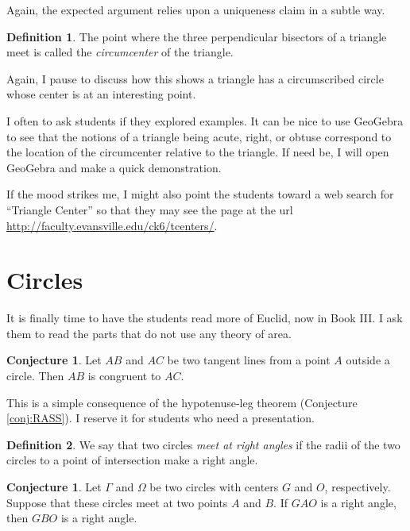 \documentclass{tufte-handout}
\theoremstyle{definition}
\newtheorem{conjecture}[problem]{Conjecture}
\newtheorem*{definition}{Definition}
\begin{document}
Again, the expected argument relies upon a uniqueness claim in a subtle way.

\begin{definition}\label{defn:circumcenter}
The point where the three perpendicular bisectors of a triangle meet is called the \emph{circumcenter} of the triangle.
\end{definition}

Again, I pause to discuss how this shows a triangle has a circumscribed circle whose center is at an interesting point.

I often to ask students if they explored examples. It can be nice to use GeoGebra to see that the notions of a triangle being acute, right, or obtuse correspond to the location of the circumcenter relative to the triangle. If need be, I will open GeoGebra and make a quick demonstration.


If the mood strikes me, I might also point the students toward a web search for ``Triangle Center'' so that they may see the page at the url \url{http://faculty.evansville.edu/ck6/tcenters/}.


\clearpage
\setcounter{section}{9}
\setcounter{problem}{0}
\section{Circles}

It is finally time to have the students read more of Euclid, now in Book III. I ask them to read the parts that do not use any theory of area. 

\begin{conjecture}\label{conj:tangents-to-circle}
Let $AB$ and $AC$ be two tangent lines from a point $A$ outside a circle. Then $AB$ is congruent to $AC$.
\end{conjecture}

This is a simple consequence of the hypotenuse-leg theorem (Conjecture \ref{conj:RASS}). I reserve it for students who need a presentation.

\begin{definition}\label{defn:circles-perp}
We say that two circles \emph{meet at right angles} if the radii of the two circles to a point of intersection make a right angle.
\end{definition}

\begin{conjecture}\label{conj:perp-circles}
Let $\Gamma$ and $\Omega$ be two circles with centers $G$ and $O$, respectively. Suppose that these circles meet at two points $A$ and $B$. If $GAO$ is a right angle, then $GBO$ is a right angle.
\end{conjecture}
\end{document}
